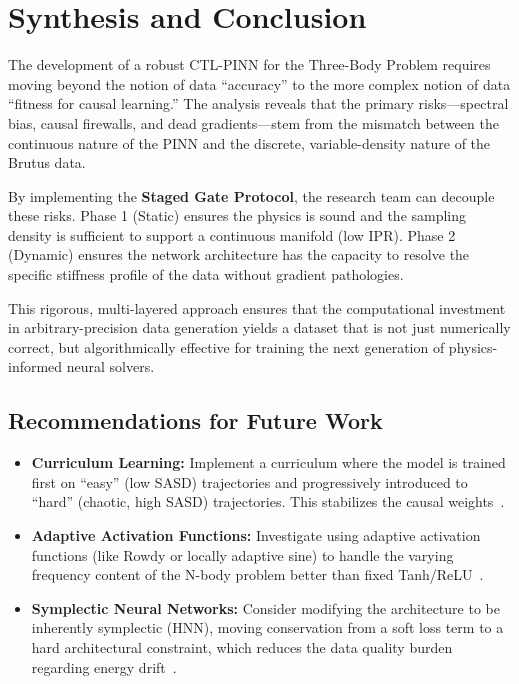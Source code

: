 \documentclass[11pt, a4paper]{article}
\begin{document}
\section{Synthesis and Conclusion}

The development of a robust CTL-PINN for the Three-Body Problem requires moving beyond the notion of data ``accuracy'' to the more complex notion of data ``fitness for causal learning.'' The analysis reveals that the primary risks—spectral bias, causal firewalls, and dead gradients—stem from the mismatch between the continuous nature of the PINN and the discrete, variable-density nature of the Brutus data.

By implementing the \textbf{Staged Gate Protocol}, the research team can decouple these risks. Phase 1 (Static) ensures the physics is sound and the sampling density is sufficient to support a continuous manifold (low IPR). Phase 2 (Dynamic) ensures the network architecture has the capacity to resolve the specific stiffness profile of the data without gradient pathologies.

This rigorous, multi-layered approach ensures that the computational investment in arbitrary-precision data generation yields a dataset that is not just numerically correct, but algorithmically effective for training the next generation of physics-informed neural solvers.

\subsection{Recommendations for Future Work}

\begin{itemize}
    \item \textbf{Curriculum Learning:} Implement a curriculum where the model is trained first on ``easy'' (low SASD) trajectories and progressively introduced to ``hard'' (chaotic, high SASD) trajectories. This stabilizes the causal weights~\cite{ref10}.
    \item \textbf{Adaptive Activation Functions:} Investigate using adaptive activation functions (like Rowdy or locally adaptive sine) to handle the varying frequency content of the N-body problem better than fixed Tanh/ReLU~\cite{ref8}.
    \item \textbf{Symplectic Neural Networks:} Consider modifying the architecture to be inherently symplectic (HNN), moving conservation from a soft loss term to a hard architectural constraint, which reduces the data quality burden regarding energy drift~\cite{ref33}.
\end{itemize}
\end{document}
